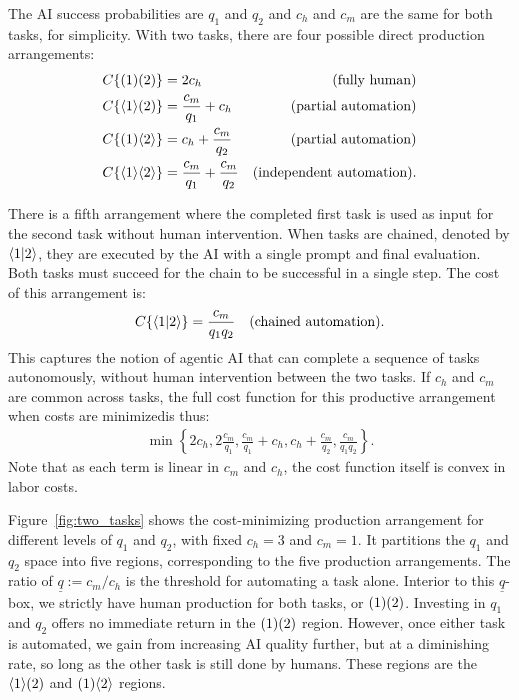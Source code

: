 \documentclass{article}
\theoremstyle{plain}
\theoremstyle{plain}
\begin{document}
The AI success probabilities are $q_1$ and $q_2$ and $c_h$ and $c_m$ are the same for both tasks, for simplicity.
With two tasks, there are four possible direct production arrangements:
\begin{align*}
    C\{ ( 1 )( 2 ) \} &= 2c_h & \text{(fully human)} \\
    C\{ \langle 1 \rangle( 2 ) \} &= \frac{c_m}{q_1} + c_h & \text{(partial automation)} \\
    C\{ ( 1 )\langle 2 \rangle \} &= c_h + \frac{c_m}{q_2} & \text{(partial automation)} \\
    C\{ \langle 1 \rangle\langle 2 \rangle \} &= \frac{c_m}{q_1} + \frac{c_m}{q_2} & \text{(independent automation)}. \\
\end{align*}

There is a fifth arrangement where the completed first task is used as input for the second task without human intervention.
When tasks are chained, denoted by $\langle 1|2 \rangle$, they are executed by the AI with a single prompt and final evaluation.
Both tasks must succeed for the chain to be successful in a single step.
The cost of this arrangement is:
\begin{align*}
C\{ \langle 1|2 \rangle \} &= \frac{c_m}{q_1q_2} & \text{(chained automation)}.
\end{align*}
This captures the notion of agentic AI that can complete a sequence of tasks autonomously, without human intervention between the two tasks.
If $c_h$ and $c_m$ are common across tasks, the full cost function for this productive arrangement when costs are minimizedis thus: 
\begin{align}
  \min \left\{2c_h, 2 \frac{c_m}{q_1}, \frac{c_m}{q_1} + c_h, c_h + \frac{c_m}{q_2}, \frac{c_m}{q_1q_2} \right\}.
\end{align}
Note that as each term is linear in $c_m$ and $c_h$, the cost function itself is convex in labor costs. 

Figure~\ref{fig:two_tasks} shows the cost-minimizing production arrangement for different levels of $q_1$ and $q_2$, with fixed $c_h = 3$ and $c_m = 1$.
It partitions the $q_1$ and $q_2$ space into five regions, corresponding to the five production arrangements.
The ratio of $\underline{q} := c_m / c_h$ is the threshold for automating a task alone.
Interior to this $\underline{q}$-box, we strictly have human production for both tasks, or $( 1 )( 2 )$.
Investing in $q_1$ and $q_2$ offers no immediate return in the $( 1 )( 2 )$ region.
However, once either task is automated, we gain from increasing AI quality further, but at a diminishing rate, so long as the other task is still done by humans.
These regions are the $\langle 1 \rangle( 2 )$ and $( 1 )\langle 2 \rangle$ regions.
\end{document}
